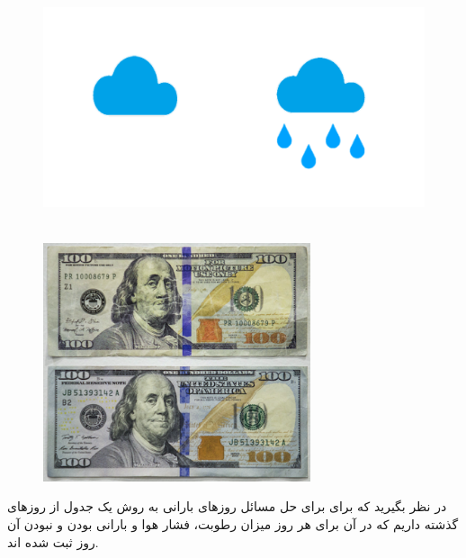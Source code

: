 \documentclass[a4paper, titlepage]{article}
\begin{document}
\begin{figure}[H]
    \center
    \begin{minipage}[b]{0.45\textwidth}
        \center
        \includegraphics[width=\textwidth, height=7cm, width=7cm]{Classification-img9.png}
        \label{Classification-img9}
    \end{minipage}
    \hfill
    \begin{minipage}[b]{0.45\textwidth}
        \center
        \includegraphics[width=\textwidth, height=7cm, width=7cm]{Classification-img8.png}
        \label{Classification-img8}
    \end{minipage}
    \caption{}
\end{figure}

\clearpage
در نظر بگیرید که برای برای حل مسائل روز‌های بارانی به روش  یک جدول از روز‌های گذشته داریم که در آن برای هر روز میزان رطوبت، فشار هوا و بارانی بودن و نبودن آن روز ثبت شده اند.


\begin{table}[H]
    \centering
    \caption{}
    \label{tab:Rainy-days}
\end{table}
\end{document}
